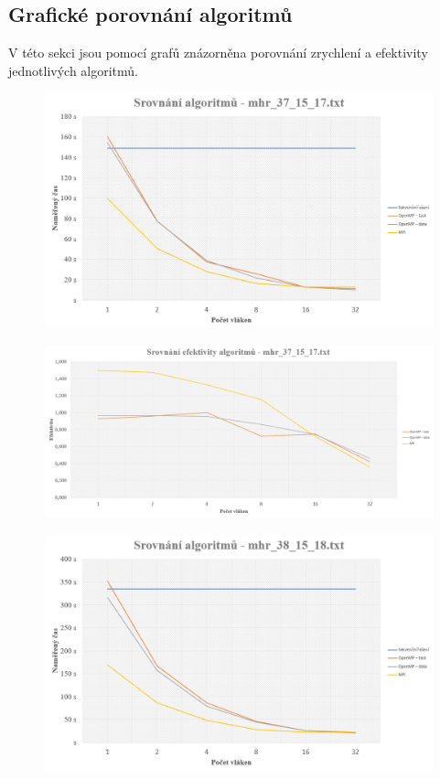 \documentclass{article}
\begin{document}
\subsection{Grafické porovnání algoritmů}

V této sekci jsou pomocí grafů znázorněna porovnání zrychlení a efektivity jednotlivých algoritmů. 

\begin{figure}[H]
    \centering
    \includegraphics[width=\textwidth]{Srovnani371517.png}
\end{figure}
\begin{figure}[H]
    \centering
    \includegraphics[width=\textwidth]{SE371517.png}
\end{figure}
\begin{figure}[H]
    \centering
    \includegraphics[width=\textwidth]{Srovnani381518.png}
\end{figure}
\end{document}
